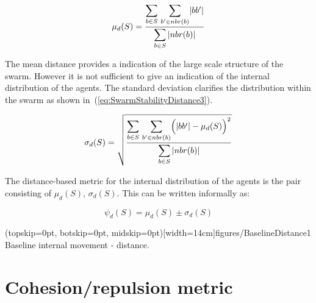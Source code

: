 \documentclass{ieeeaccess}
\begin{document}
\begin{equation}
\label{eq:SwarmStabilityDistance2}
\mu_d(S) = \frac{\mathlarger{\sum_{b \in S}}~\mathlarger{\sum_{b' \in nbr(b)}}|bb'|}{\mathlarger{\sum_{b \in S}|nbr(b)|}}
\end{equation}

The mean distance provides a indication of the large scale structure of the swarm. However it is not sufficient to give an indication of the internal distribution of the agents. The standard deviation clarifies the distribution within the swarm as shown in~(\ref{eq:SwarmStabilityDistance3}). 


\begin{equation}
\label{eq:SwarmStabilityDistance3}
\sigma_d(S) = \sqrt{\frac{\mathlarger{\sum_{b \in S}}~\mathlarger{\sum_{b' \in nbr(b)}}\Big(|bb'| - \mu_d(S)\Big)^2}{\mathlarger{\sum_{b \in S}|nbr(b)|}}}
\end{equation}

The distance-based metric for the internal distribution of the agents is the pair consisting of $\mu_d(S)$, $\sigma_d(S)$. This can be written informally as:

\begin{equation}
\label{eq:SwarmDistanceMetric}
\psi_d(S) = \mu_d(S)\pm \sigma_d(S)
\end{equation}

\Figure[t!](topskip=0pt, botskip=0pt, midskip=0pt)[width=14cm]{figures/BaselineDistance1}
{Baseline internal movement - distance.\label{coord:BaselineDistance1}}


\section{Cohesion/repulsion metric\label{section:MagnitudeDynamics}}
\end{document}
